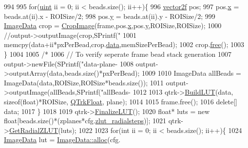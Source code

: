 \begin{DoxyCode}
{{{994 
995         \textcolor{keywordflow}{for}(\hyperlink{std__incl_8h_a91ad9478d81a7aaf2593e8d9c3d06a14}{uint} ii = 0; ii < beads.size(); ii++)\{  
996             \hyperlink{structvector2}{vector2f} pos;
997             pos.\hyperlink{structvector2_a22b63498d8e4abf9a2da054a247965b9}{x} = beads.at(ii).x - ROISize/2;
998             pos.\hyperlink{structvector2_a00b3268bc895adddf0b72d6acd8274a7}{y} = beads.at(ii).y - ROISize/2;
999             \hyperlink{struct_t_image_data}{ImageData} crop = \hyperlink{testutils_8cpp_a29b1737f82e8b172b32a0133894fb295}{CropImage}(frame,pos.\hyperlink{structvector2_a22b63498d8e4abf9a2da054a247965b9}{x},pos.\hyperlink{structvector2_a00b3268bc895adddf0b72d6acd8274a7}{y},ROISize,ROISize);
1000             \textcolor{comment}{//output->outputImage(crop,SPrintf("%
1001             memcpy(data+ii*pxPerBead,crop.\hyperlink{struct_t_image_data_a78c7415ecee3965da7e25149cea6f4d8}{data},memSizePerBead);
1002             crop.\hyperlink{struct_t_image_data_a60a60e309657216a2e35809fdc582b11}{free}();
1003         \}
1004         
1005         \textcolor{comment}{/*}
1006 \textcolor{comment}{        // To verify seperate frame bead stack generation}
1007 \textcolor{comment}{        output->newFile(SPrintf("data-plane-%
1008 \textcolor{comment}{        output->outputArray(data,beads.size()*pxPerBead);}
1009 \textcolor{comment}{}
1010 \textcolor{comment}{        ImageData allBeads = ImageData(data,ROISize,ROISize*beads.size());}
1011 \textcolor{comment}{        output->outputImage(allBeads,SPrintf("allBeads-%
1012         
1013         qtrk->\hyperlink{class_queued_c_u_d_a_tracker_a16da9256e496b6689079330a062c7529}{BuildLUT}(data, \textcolor{keyword}{sizeof}(\textcolor{keywordtype}{float})*ROISize, \hyperlink{qtrk__c__api_8h_aad82367b3ea592a142bb50a2fb538b0bafeece00bcf1a42419e686ef0cf006a4e}{QTrkFloat}, plane);
1014         
1015         frame.free();
1016         \textcolor{keyword}{delete}[] data;
1017     \}
1018 
1019     qtrk->\hyperlink{class_queued_c_u_d_a_tracker_a628a79df6cce9a1df9a4da78da266578}{FinalizeLUT}();
1020     \textcolor{keywordtype}{float}* luts = \textcolor{keyword}{new} \textcolor{keywordtype}{float}[beads.size()*(zplanes*cfg.\hyperlink{struct_q_trk_computed_config_ad1a121fa7d3152df6788ff285e4d2dc6}{zlut\_radialsteps})];
1021     qtrk->\hyperlink{class_queued_c_u_d_a_tracker_a1298fa3749c2ffaf7e48370ca15e3beb}{GetRadialZLUT}(luts);
1022     
1023     \textcolor{keywordflow}{for}(\textcolor{keywordtype}{int} ii = 0; ii < beads.size(); ii++)\{
1024         \hyperlink{struct_t_image_data}{ImageData} lut = \hyperlink{struct_t_image_data_a8ae528964e70c0d0a98b8481cc8b083e}{ImageData::alloc}(cfg.
}}}}}}
\end{DoxyCode}
